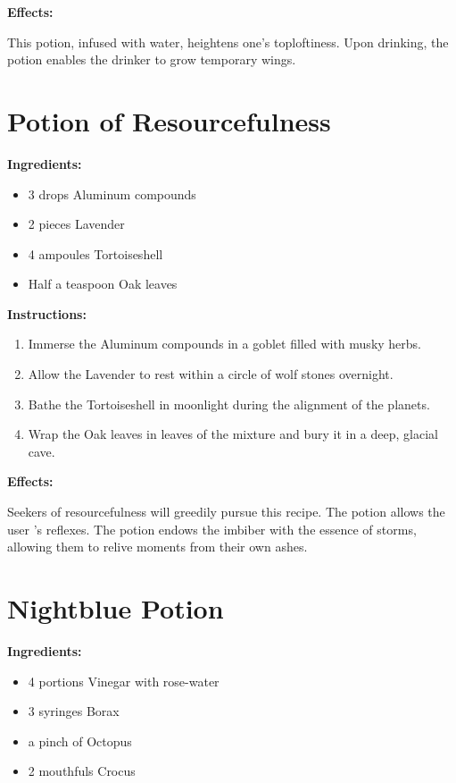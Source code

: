 \documentclass{article}
\begin{document}
\textbf{Effects:}

This potion, infused with water, heightens one's toploftiness. Upon drinking, the potion enables the drinker to grow temporary wings.

\newpage
\section*{Potion of Resourcefulness}

\textbf{Ingredients:}

\begin{itemize}
  \item 3 drops Aluminum compounds
  \item 2 pieces Lavender
  \item 4 ampoules Tortoiseshell
  \item Half a teaspoon Oak leaves
\end{itemize}

\textbf{Instructions:}

\begin{enumerate}
  \item Immerse the Aluminum compounds in a goblet filled with musky herbs.
  \item Allow the Lavender to rest within a circle of wolf stones overnight.
  \item Bathe the Tortoiseshell in moonlight during the alignment of the planets.
  \item Wrap the Oak leaves in leaves of the mixture and bury it in a deep, glacial cave.
\end{enumerate}

\textbf{Effects:}

Seekers of resourcefulness will greedily pursue this recipe. The potion allows the user 's reflexes. The potion endows the imbiber with the essence of storms, allowing them to relive moments from their own ashes.

\newpage
\section*{Nightblue Potion}

\textbf{Ingredients:}

\begin{itemize}
  \item 4 portions Vinegar with rose-water
  \item 3 syringes Borax
  \item a pinch of Octopus
  \item 2 mouthfuls Crocus
\end{itemize}
\end{document}
